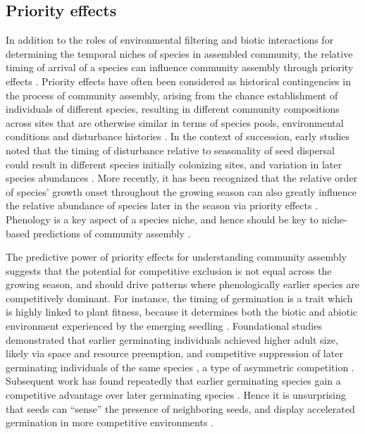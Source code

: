 \documentclass[11pt]{article}
\begin{document}
\subsection*{Priority effects}

In addition to the roles of environmental filtering and biotic interactions for determining the temporal niches of species in assembled community, the relative timing of arrival of a species can influence community assembly through priority effects \citep{alford1985priority,chase2003community,fukami2015historical}. Priority effects have often been considered as historical contingencies in the process of community assembly, arising from the chance establishment of individuals of different species, resulting in different community compositions across sites that are otherwise similar in terms of species pools, environmental conditions and disturbance histories \citep[e.g.][]{diamond1975assembly}. In the context of succession, early studies noted that the timing of disturbance relative to seasonality of seed dispersal could result in different species initially colonizing sites, and variation in later species abundances \citep{keever1950causes,holt1972effect}. More recently, it has been recognized that the relative order of species’ growth onset throughout the growing season can also greatly influence the relative abundance of species later in the season via priority effects \citep{fukami2015historical,wainwright2012seasonal,rudolf2019role}.  Phenology is a key aspect of a species niche, and hence should be key to niche-based predictions of community assembly \citep{vannette2014historical}.

The predictive power of priority effects for understanding community assembly suggests that the potential for competitive exclusion is not equal across the growing season, and should drive patterns where phenologically earlier species are competitively dominant. For instance, the timing of germination is a trait which is highly linked to plant fitness, because it determines both the biotic and abiotic environment experienced by the emerging seedling \citep{donohue2010germination}. Foundational studies demonstrated that earlier germinating individuals achieved higher adult size, likely via space and resource preemption, and competitive suppression of later germinating individuals of the same species \citep{ross1972occupation},  a type of asymmetric competition \citep{connolly1996asymmetric}. Subsequent work has found repeatedly that earlier germinating species gain a competitive advantage over later germinating species \citep{cleland2015priority,waterton2016trade,blackford2020species}. Hence it is unsurprising that seeds can “sense” the presence of neighboring seeds, and display accelerated germination in more competitive environments \citep{dyer2000accelerated}.
\end{document}
